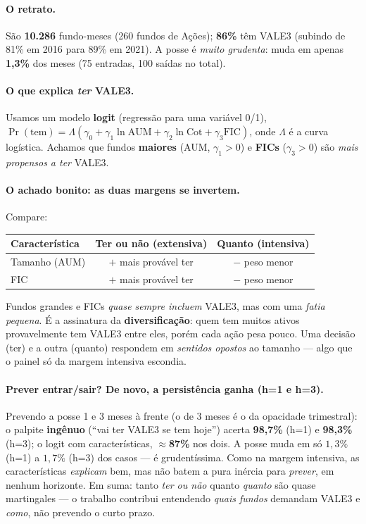 \documentclass[11pt]{article}
\begin{document}
\paragraph{O retrato.} São \textbf{10.286} fundo-meses (260 fundos de Ações);
\textbf{86\%} têm VALE3 (subindo de 81\% em 2016 para 89\% em 2021). A posse é
\emph{muito grudenta}: muda em apenas \textbf{1,3\%} dos meses (75 entradas, 100 saídas
no total).

\paragraph{O que explica \emph{ter} VALE3.} Usamos um modelo \textbf{logit} (regressão
para uma variável 0/1), $\Pr(\text{tem}) = \Lambda(\gamma_0 + \gamma_1\ln\text{AUM} +
\gamma_2\ln\text{Cot} + \gamma_3\text{FIC})$, onde $\Lambda$ é a curva logística. Achamos
que fundos \textbf{maiores} (AUM, $\gamma_1>0$) e \textbf{FICs} ($\gamma_3>0$) são
\emph{mais propensos a ter} VALE3.

\paragraph{O achado bonito: as duas margens se invertem.} Compare:
\begin{center}
\begin{tabular}{@{}lcc@{}}
\toprule
Característica & \textbf{Ter ou não} (extensiva) & \textbf{Quanto} (intensiva) \\
\midrule
Tamanho (AUM) & $+$ mais provável ter & $-$ peso menor \\
FIC           & $+$ mais provável ter & $-$ peso menor \\
\bottomrule
\end{tabular}
\end{center}
\noindent Fundos grandes e FICs \emph{quase sempre incluem} VALE3, mas com uma
\emph{fatia pequena}. É a assinatura da \textbf{diversificação}: quem tem muitos ativos
provavelmente tem VALE3 entre eles, porém cada ação pesa pouco. Uma decisão (ter) e a
outra (quanto) respondem em \emph{sentidos opostos} ao tamanho --- algo que o painel só
da margem intensiva escondia.

\paragraph{Prever entrar/sair? De novo, a persistência ganha (h=1 e h=3).} Prevendo a
posse 1 e 3 meses à frente (o de 3 meses é o da opacidade trimestral): o palpite
\textbf{ingênuo} (``vai ter VALE3 se tem hoje'') acerta \textbf{98,7\%} (h=1) e
\textbf{98,3\%} (h=3); o logit com características, $\approx$\textbf{87\%} nos dois. A
posse muda em só $1{,}3\%$ (h=1) a $1{,}7\%$ (h=3) dos casos --- é grudentíssima. Como na
margem intensiva, as características \emph{explicam} bem, mas não batem a pura inércia
para \emph{prever}, em nenhum horizonte. Em suma: tanto \emph{ter ou não} quanto
\emph{quanto} são quase martingales --- o trabalho contribui entendendo \emph{quais
fundos} demandam VALE3 e \emph{como}, não prevendo o curto prazo.
\end{document}
